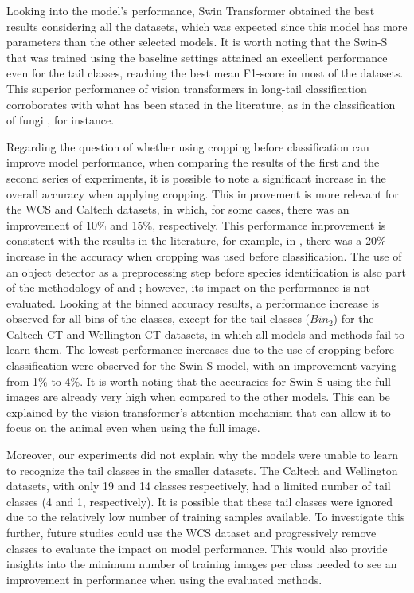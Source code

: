 Looking into the model’s performance, Swin Transformer obtained the best results
considering all the datasets, which was expected since this model has more
parameters than the other selected models. It is worth noting that the Swin-S
that was trained using the baseline settings attained an excellent performance
even for the tail classes, reaching the best mean F1-score in most of the
datasets. This superior performance of vision transformers in long-tail
classification corroborates with what has been stated in the literature, as in
the classification of fungi \citep{picek2022danish}, for instance.

Regarding the question of whether using cropping before classification can
improve model performance, when comparing the results of the first and the
second series of experiments, it is possible to note a significant increase in
the overall accuracy when applying cropping. This improvement is more relevant
for the WCS and Caltech datasets, in which, for some cases, there was an
improvement of 10\% and 15\%, respectively. This performance improvement is
consistent with the results in the literature, for example, in
\citep{beery2018recognition}, there was a 20\% increase in the accuracy when
cropping was used before classification. The use of an object detector as a
preprocessing step before species identification is also part of the methodology
of \citet{schneider2018deep} and \citet{norouzzadeh2021deep}; however, its
impact on the performance is not evaluated. Looking at the binned accuracy
results, a performance increase is observed for all bins of the classes, except
for the tail classes ($Bin_2$) for the Caltech CT and Wellington CT datasets, in
which all models and methods fail to learn them. The lowest performance
increases due to the use of cropping before classification were observed for the
Swin-S model, with an improvement varying from 1\% to 4\%. It is worth noting
that the accuracies for Swin-S using the full images are already very high when
compared to the other models. This can be explained by the vision transformer’s
attention mechanism that can allow it to focus on the animal even when using the
full image.

Moreover, our experiments did not explain why the models were unable to learn to
recognize the tail classes in the smaller datasets. The Caltech and Wellington
datasets, with only 19 and 14 classes respectively, had a limited number of tail
classes (4 and 1, respectively). It is possible that these tail classes were
ignored due to the relatively low number of training samples available. To
investigate this further, future studies could use the WCS dataset and
progressively remove classes to evaluate the impact on model performance. This
would also provide insights into the minimum number of training images per
class needed to see an improvement in performance when using the evaluated
methods.

